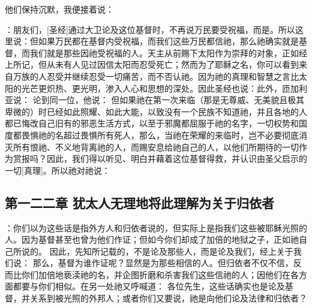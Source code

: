 他们保持沉默，我便接着说：\par

：朋友们，[圣经]通过大卫论及这位基督时，不再说万民要受祝福，而是。所以这里说：但如果万民都在基督内受祝福，而我们这些万民都信祂，那么祂确实就是基督，而我们就是那些因祂受祝福的人。天主从前赐下太阳作为崇拜的对象，正如经上所记，但从未有人见过因信太阳而忍受死亡；然而为了耶稣之名，你可以看到来自万族的人忍受并继续忍受一切痛苦，而不否认祂。因为祂的真理和智慧之言比太阳的光芒更炽热、更光明，渗入人心和思想的深处。因此圣经也说：此外，匝加利亚说： 论到同一位，他说： 但如果祂在第一次来临（那是无尊威、无美貌且极其卑微的）时已经如此照耀、如此大能，以致没有一个民族不知道祂，并且各地的人都已悔改自己旧有的邪恶生活方式，以至于邪魔都屈服于祂的名字，一切权势和国度都畏惧祂的名超过畏惧所有死人，那么，当祂在荣耀的来临时，岂不必要彻底消灭所有恨祂、不义地背离祂的人，而赐安息给祂自己的人，以他们所期待的一切作为赏报吗？因此，我们得以听见、明白并藉着这位基督得救，并认识由圣父启示的一切[真理]。所以祂对祂说：\par


\subsection{第一二二章 犹太人无理地将此理解为关于归依者}

：你们以为这些话是指外方人和归依者说的，但实际上是指我们这些被耶稣光照的人。因为基督甚至也曾为他们作证；但如今你们却成了加倍的地狱之子，正如祂自己所说的。 因此，先知所记载的，不是论及那些人，而是论及我们，经上关于我们说： 那么，基督为谁作证呢？显然是为那些相信的人。但归依者不仅不信，反而比你们加倍地亵渎祂的名，并企图折磨和杀害我们这些信祂的人；因他们在各方面都要与你们相似。在另一处祂又呼喊道： 各位先生，这些话确实也是论及基督，并关系到被光照的外邦人；或者你们又要说，祂是向他们论及法律和归依者？\par

